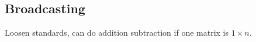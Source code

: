 
\subsection{Broadcasting}

Loosen standards, can do addition subtraction if one matrix is \(1\times n\).

